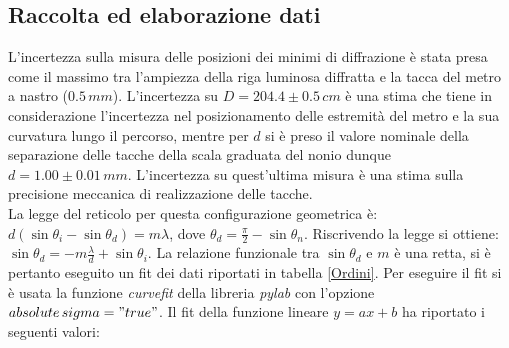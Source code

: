 \documentclass[10pt,a4paper]{article}
\begin{document}


\subsection{Raccolta ed elaborazione dati}

L'incertezza sulla misura delle posizioni dei minimi di diffrazione è stata presa come il massimo tra l'ampiezza della riga luminosa diffratta e la tacca del metro a nastro ($0.5 \,mm$). L'incertezza su $D = 204.4 \pm 0.5 \, cm$ è una stima che tiene in considerazione l'incertezza nel posizionamento delle estremità del metro e la sua curvatura lungo il percorso, mentre per $d$ si è preso il valore nominale della separazione delle tacche della scala graduata del nonio dunque $d = 1.00 \pm 0.01 \, mm$. L'incertezza su quest'ultima misura è una stima sulla precisione meccanica di realizzazione delle tacche.\\
La legge del reticolo per questa configurazione geometrica è: $d(\sin  \theta_i - \sin \theta_d)  = m \lambda $, dove $\theta_d = \frac{\pi}{2} - \sin \theta_n $. Riscrivendo la legge si ottiene: $\sin \theta_d = -m \frac{\lambda}{d} + \sin \theta_i$. La relazione funzionale tra $\sin  \theta_d$ e $m$ è una retta, si è pertanto eseguito un fit dei dati riportati in tabella \ref{Ordini}. Per eseguire il fit si è usata la funzione \emph{curvefit} della libreria \emph{pylab} con l'opzione \emph{$absolute\,sigma = "true"$}. Il fit della funzione lineare $y = ax+b$ ha riportato i seguenti valori: \\
\end{document}
